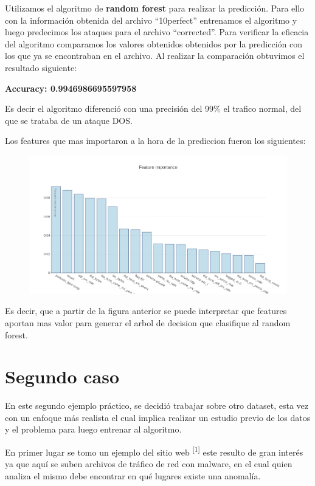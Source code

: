 \documentclass[a4paper,10pt]{article}
\begin{document}
Utilizamos el algoritmo de \textbf{random forest} para realizar la predicción. Para ello con la información obtenida del archivo “10perfect” entrenamos el algoritmo y luego predecimos los ataques para el archivo “corrected”. Para verificar la eficacia del algoritmo comparamos los valores obtenidos obtenidos por la predicción con los que ya se encontraban en el archivo. Al realizar la comparación obtuvimos el resultado siguiente:

\textbf{Accuracy: 0.9946986695597958}


\medskip

\normalsize Es decir el algoritmo diferenció con una precisión del 99\% el trafico normal, del que se trataba de un ataque DOS.


Los features que mas importaron a la hora de la prediccion fueron los siguientes:
\begin{figure}[!hbp]
\centering
\includegraphics[scale=0.4]{Wireshark/newplot(5).png} 
\caption{}
\end{figure}

Es decir, que a partir de la figura anterior se puede interpretar que features aportan mas valor para generar el arbol de decision que clasifique al random forest.



\newpage
\section{Segundo caso}


En este segundo ejemplo práctico, se decidió trabajar sobre otro dataset, esta vez con un enfoque más realista el cual implica realizar un estudio previo de los datos y el problema para luego entrenar al algoritmo.

\medskip
En primer lugar se tomo un ejemplo del sitio web \textsuperscript{[1]} este resulto de gran interés ya que aquí se suben archivos de tráfico de red con malware, en el cual quien analiza el mismo debe encontrar en qué lugares existe una anomalía.
\end{document}
